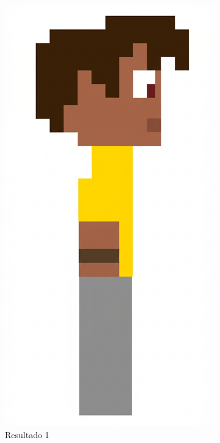 \begin{figure}[htbp]
\begin{subfigure}{0.3\linewidth}
        \includegraphics[width=1\linewidth]{figs/geminiPro/chat2/res1_tela1.png}
        \caption{\small Resultado 1}
        \label{fig:geminiPro4a}
    \end{subfigure}
    \begin{subfigure}{0.3\linewidth}

\end{subfigure}
\end{figure}
